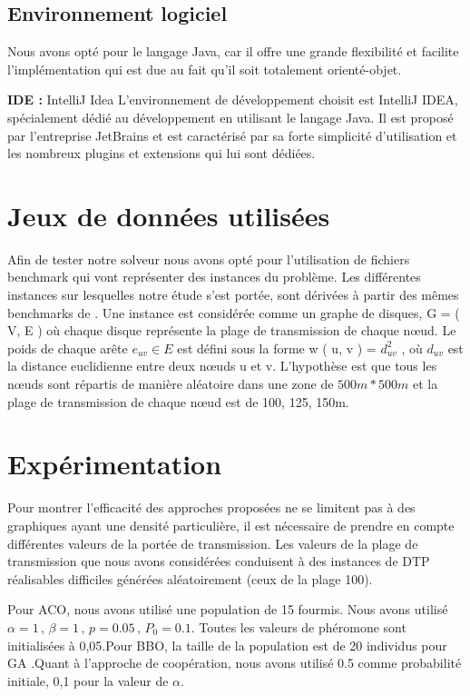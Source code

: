 \subsection{Environnement logiciel}
Nous avons opté pour le langage Java, car il offre une grande flexibilité et facilite l’implémentation qui est due au fait qu’il soit totalement orienté-objet.

\textbf{IDE :}
IntelliJ Idea L’environnement de développement choisit est IntelliJ IDEA, spécialement dédié au développement en utilisant le langage Java. Il est proposé par l’entreprise JetBrains et est caractérisé par sa forte simplicité d’utilisation et les nombreux plugins et extensions qui lui sont dédiées.

\section{Jeux de données utilisées}

Afin de tester notre solveur nous avons opté pour l’utilisation de fichiers benchmark qui vont représenter des instances du problème. Les différentes instances sur lesquelles notre étude s’est portée, sont dérivées à partir des mêmes benchmarks de \cite{sundar2013new}. Une instance est considérée comme un graphe de disques, G = ( V, E ) où chaque disque représente la plage de transmission de chaque nœud. Le poids de chaque arête $e_{uv} \in E $ est défini sous la forme w ( u, v ) = $d_{uv}^2$ , où $d_{uv}$ est la distance euclidienne entre deux nœuds u et v. L’hypothèse est que tous les nœuds sont répartis de manière aléatoire dans une zone de  $500m * 500m $  et la plage de transmission de chaque nœud est de 100, 125, 150m.

\section{Expérimentation}
Pour montrer l'efficacité des approches proposées ne se limitent pas à des graphiques ayant une densité particulière, il est nécessaire de prendre en compte différentes valeurs de la portée de transmission. Les valeurs de la plage de transmission que nous avons considérées conduisent à des instances de DTP réalisables difficiles générées aléatoirement (ceux de la plage 100).

Pour ACO, nous avons utilisé une population de 15 fourmis. Nous avons utilisé $\alpha = 1 \, , \, \beta = 1 \, , \, p = 0.05 \, , \, P_0 = 0.1 $. Toutes les valeurs de phéromone sont initialisées à 0,05.Pour BBO, la taille de la population est de 20 individus pour GA .Quant à l’approche de coopération, nous avons utilisé 0.5 comme probabilité initiale, 0,1 pour la valeur de \( \alpha \).

